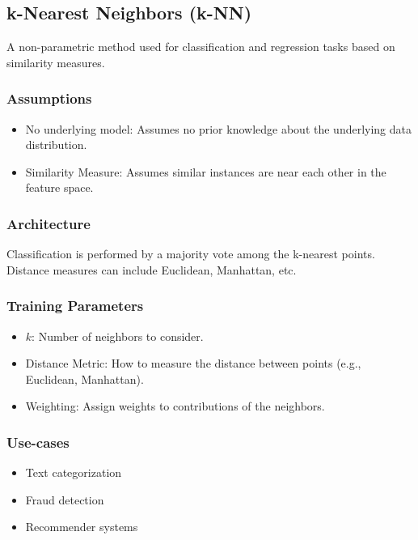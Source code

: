 \documentclass[english, threecolumn]{latex4ei/latex4ei_sheet}
\begin{document}
\begin{sectionbox}
\subsection{k-Nearest Neighbors (k-NN)}

A non-parametric method used for classification and regression tasks based on similarity measures.

\subsubsection{Assumptions}
\begin{itemize}
    \item No underlying model: Assumes no prior knowledge about the underlying data distribution.
    \item Similarity Measure: Assumes similar instances are near each other in the feature space.
\end{itemize}

\subsubsection{Architecture}
Classification is performed by a majority vote among the k-nearest points. Distance measures can include Euclidean, Manhattan, etc.

\subsubsection{Training Parameters}
\begin{itemize}
    \item \( k \): Number of neighbors to consider.
    \item Distance Metric: How to measure the distance between points (e.g., Euclidean, Manhattan).
    \item Weighting: Assign weights to contributions of the neighbors.
\end{itemize}

\subsubsection{Use-cases}
\begin{itemize}
    \item Text categorization
    \item Fraud detection
    \item Recommender systems
\end{itemize}


\end{sectionbox}
\end{document}
